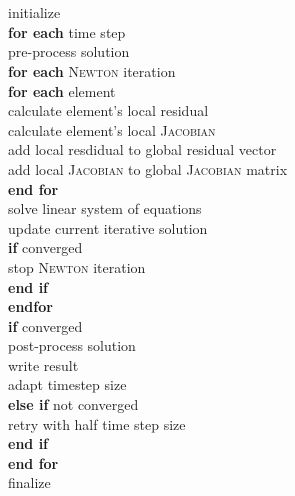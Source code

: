 \clearpage
\begin{tabbing}
\textbf{} 			\hspace{0.01\textwidth} \=
\textbf{} 			\hspace{0.01\textwidth} \=
\textbf{} 	\hspace{0.01\textwidth}	\= 
\textbf{} 			\hspace{0.01\textwidth} \\
\\
initialize \\
\textbf{for each} time step\\

\> pre-process solution\\
\> \textbf{for each} \textsc{Newton} iteration \\

\> \> \textbf{for each} element \\

\> \> \> calculate element's local residual \\
\> \> \> calculate element's local \textsc{Jacobian} \\
\> \> \> add local resdidual to global residual vector \\
\> \> \> add local \textsc{Jacobian} to global \textsc{Jacobian} matrix \\

\> \> \textbf{end for} \\

\> \> solve linear system of equations\\
\> \> update current iterative solution\\
\> \> \textbf{if} converged \\
\> \> \qquad stop \textsc{Newton} iteration\\
\> \> \textbf{end if} \\
\> \textbf{endfor}\\
\> \textbf{if} converged \\
\> \qquad post-process solution\\
\> \qquad write result\\
\> \qquad adapt timestep size \\
\> \textbf{else if} not converged \\
\> \qquad retry with half time step size\\
\> \textbf{end if} \\
\textbf{end for}\\
finalize\\
\end{tabbing}


